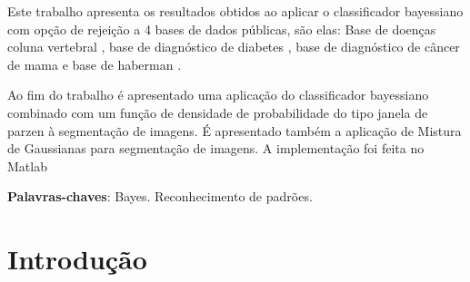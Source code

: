 \documentclass[ 
	article,			%
	11pt,				%
	oneside,			%
	a4paper,			%
	english,			%
	brazil,				%
	]{abntex2}
\begin{document}
\frenchspacing 


%
%
\maketitle

\begin{resumoumacoluna}
 Este trabalho apresenta os resultados obtidos ao aplicar o classificador
 bayessiano com opção de rejeição a 4 bases de dados públicas, são elas: Base
 de doenças coluna vertebral \cite{5349049}, base de diagnóstico de diabetes
 \cite{smith1988using}, base de diagnóstico de câncer de
 mama\cite{mangasarian1995breast} e base de haberman \cite{lo1993logistic}.
 
 Ao fim do trabalho é apresentado uma aplicação do classificador bayessiano
 combinado com um função de densidade de probabilidade do tipo janela de parzen
 à segmentação de imagens. É apresentado também a aplicação de Mistura de
 Gaussianas para segmentação de imagens.
 A implementação foi feita no Matlab\texttrademark
 
 
 \vspace{\onelineskip}
 
 \noindent
 \textbf{Palavras-chaves}: Bayes. Reconhecimento de padrões.
\end{resumoumacoluna}


\textual

\section*{Introdução}


\end{document}
